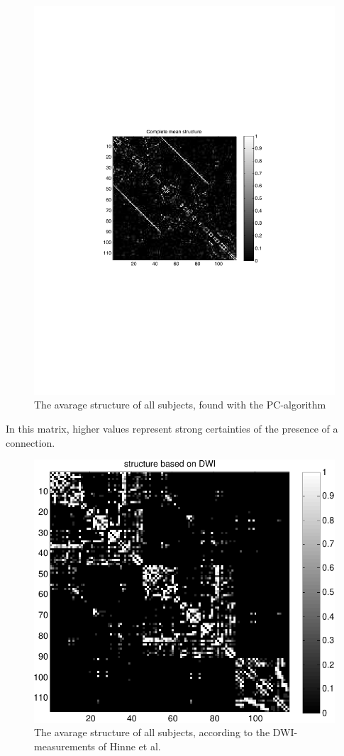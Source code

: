 \documentclass[a4paper, 10pt, english, onecolumn]{article}
\begin{document}
\begin{figure}[h!]
  \centering
  \includegraphics{images/struct_full_mean_gray}
  \caption{The avarage structure of all subjects, found with the PC-algorithm}
  \label{fig:struct_avg}
\end{figure}
In this matrix, higher values represent strong certainties of the presence of a connection.

\begin{figure}[h!]
  \centering
  \includegraphics{images/structure_max}
  \caption{The avarage structure of all subjects, according to the DWI-measurements of Hinne et al.}
  \label{fig:struct_max}
\end{figure}
\end{document}
